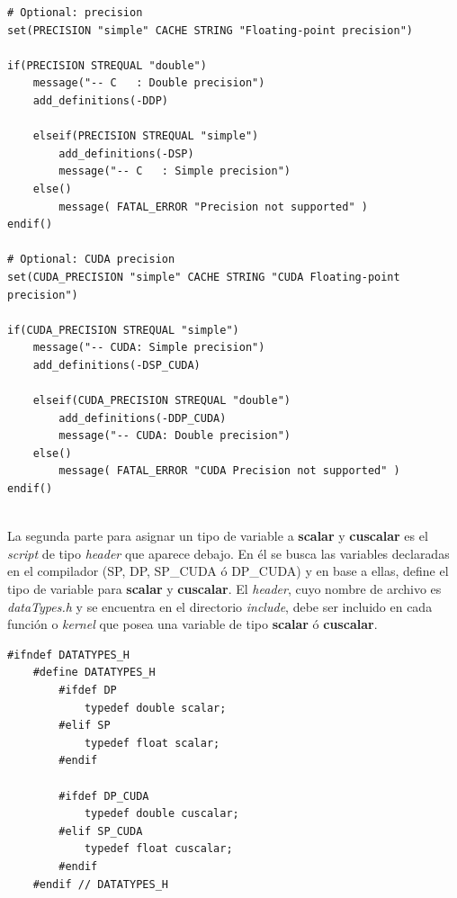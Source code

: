 \newpage
{\scriptsize
	\begin{frame}{}
		\begin{lstlisting}[frame=single]
# Optional: precision
set(PRECISION "simple" CACHE STRING "Floating-point precision")

if(PRECISION STREQUAL "double")
	message("-- C   : Double precision")
	add_definitions(-DDP)

	elseif(PRECISION STREQUAL "simple")
		add_definitions(-DSP)
		message("-- C   : Simple precision")
	else()
		message( FATAL_ERROR "Precision not supported" )
endif()

# Optional: CUDA precision
set(CUDA_PRECISION "simple" CACHE STRING "CUDA Floating-point precision")

if(CUDA_PRECISION STREQUAL "simple")
	message("-- CUDA: Simple precision")
	add_definitions(-DSP_CUDA)

	elseif(CUDA_PRECISION STREQUAL "double")
		add_definitions(-DDP_CUDA)
		message("-- CUDA: Double precision")
	else()
		message( FATAL_ERROR "CUDA Precision not supported" )
endif()
		
		\end{lstlisting}
		
	\end{frame}
}
La segunda parte para asignar un tipo de variable a \textbf{scalar} y \textbf{cuscalar} es el \textit{script} de tipo \textit{header} que aparece debajo. En él se busca las variables declaradas en el compilador (SP, DP, SP\_CUDA ó DP\_CUDA) y en base a ellas, define el tipo de variable para \textbf{scalar} y \textbf{cuscalar}. El \textit{header}, cuyo nombre de archivo es \textit{dataTypes.h} y se encuentra en el directorio \textit{include}, debe ser incluido en cada función o \textit{kernel} que posea una variable de tipo  \textbf{scalar} ó \textbf{cuscalar}.

{\footnotesize
	\begin{frame}{}
		\begin{lstlisting}[frame=single]
	#ifndef DATATYPES_H
	#define DATATYPES_H
		#ifdef DP
			typedef double scalar;
		#elif SP
			typedef float scalar;
		#endif	
		
		#ifdef DP_CUDA
			typedef double cuscalar;
		#elif SP_CUDA
			typedef float cuscalar;
		#endif
	#endif // DATATYPES_H
		
		\end{lstlisting}
		
	\end{frame}
}
\newpage

